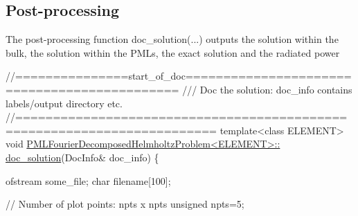 \hypertarget{index_p_process}{}\subsection{Post-\/processing}\label{index_p_process}
The post-\/processing function {\ttfamily doc\+\_\+solution}(...) outputs the solution within the bulk, the solution within the P\+M\+Ls, the exact solution and the radiated power

 
\begin{DoxyCodeInclude}
\textcolor{comment}{//===============start\_of\_doc=============================================}
\textcolor{comment}{/// Doc the solution: doc\_info contains labels/output directory etc.}
\textcolor{comment}{}\textcolor{comment}{//========================================================================}
\textcolor{keyword}{template}<\textcolor{keyword}{class} ELEMENT>
\textcolor{keywordtype}{void} \hyperlink{classPMLFourierDecomposedHelmholtzProblem_afcdfaf86efc75fbea14f6ade9eeb7f9c}{PMLFourierDecomposedHelmholtzProblem<ELEMENT>::}
\hyperlink{classPMLFourierDecomposedHelmholtzProblem_afcdfaf86efc75fbea14f6ade9eeb7f9c}{doc\_solution}(DocInfo& doc\_info)
\{

 ofstream some\_file;
 \textcolor{keywordtype}{char} filename[100];

 \textcolor{comment}{// Number of plot points: npts x npts}
 \textcolor{keywordtype}{unsigned} npts=5;

\end{DoxyCodeInclude}









